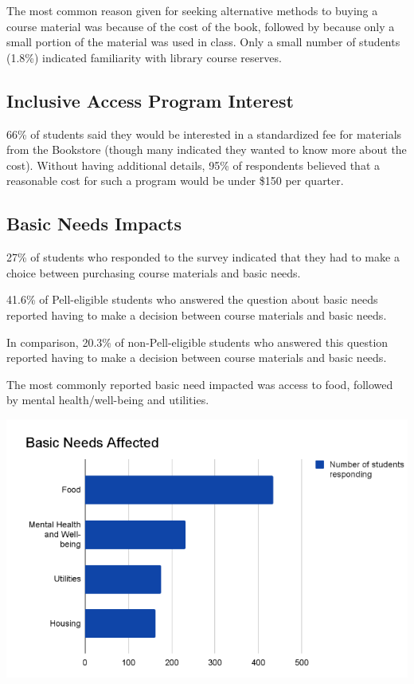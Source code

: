 \documentclass[
  letterpaper,
  DIV=11,
  numbers=noendperiod]{scrreprt}
\begin{document}
The most common reason given for seeking alternative methods to buying a
course material was because of the cost of the book, followed by because
only a small portion of the material was used in class. Only a small
number of students (1.8\%) indicated familiarity with library course
reserves.

\hypertarget{inclusive-access-program-interest}{%
\subsection{Inclusive Access Program
Interest}\label{inclusive-access-program-interest}}

66\% of students said they would be interested in a standardized fee for
materials from the Bookstore (though many indicated they wanted to know
more about the cost). Without having additional details, 95\% of
respondents believed that a reasonable cost for such a program would be
under \$150 per quarter.

\hypertarget{basic-needs-impacts}{%
\subsection{Basic Needs Impacts}\label{basic-needs-impacts}}

27\% of students who responded to the survey indicated that they had to
make a choice between purchasing course materials and basic needs.

41.6\% of Pell-eligible students who answered the question about basic
needs reported having to make a decision between course materials and
basic needs.

In comparison, 20.3\% of non-Pell-eligible students who answered this
question reported having to make a decision between course materials and
basic needs.

The most commonly reported basic need impacted was access to food,
followed by mental health/well-being and utilities.

\includegraphics{./viz/alfs/AOCM_basic_needs.png}
\end{document}
